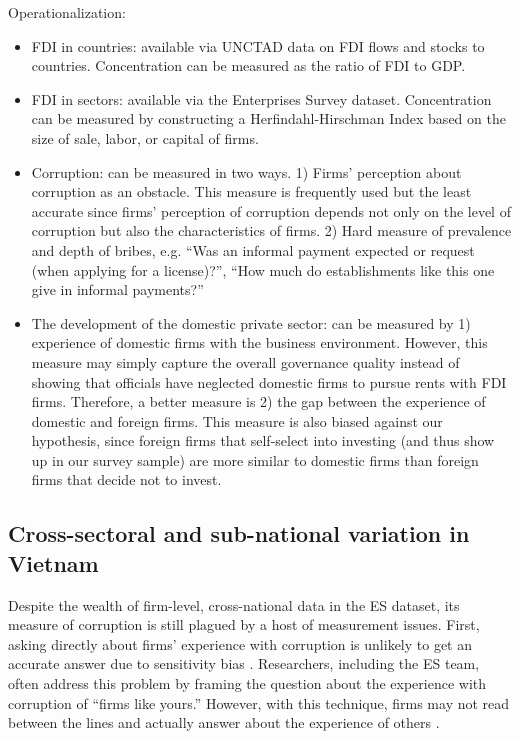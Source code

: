 \documentclass[12pt]{article}
\begin{document}
Operationalization:
\begin{itemize}
\item FDI in countries: available via UNCTAD data on FDI flows and stocks to countries. Concentration can be measured as the ratio of FDI to GDP.
\item FDI in sectors: available via the Enterprises Survey dataset. Concentration can be measured by constructing a Herfindahl-Hirschman Index based on the size of sale, labor, or capital of firms.
\item Corruption: can be measured in two ways. 1) Firms' perception about corruption as an obstacle. This measure is frequently used but the least accurate since firms' perception of corruption depends not only on the level of corruption but also the characteristics of firms. 2) Hard measure of prevalence and depth of bribes, e.g. ``Was an informal payment expected or request (when applying for a license)?'', ``How much do establishments like this one give in informal payments?''  

\item The development of the domestic private sector: can be measured by 1) experience of domestic firms with the business environment. However, this measure may simply capture the overall governance quality instead of showing that officials have neglected domestic firms to pursue rents with FDI firms. Therefore, a better measure is 2) the gap between the experience of domestic and foreign firms. This measure is also biased against our hypothesis, since foreign firms that self-select into investing (and thus show up in our survey sample) are more similar to domestic firms than foreign firms that decide not to invest.
\end{itemize}

\subsection{Cross-sectoral and sub-national variation in Vietnam}

Despite the wealth of firm-level, cross-national data in the ES dataset, its measure of corruption is still plagued by a host of measurement issues. First, asking directly about firms' experience with corruption is unlikely to get an accurate answer due to sensitivity bias \citep{Coutts2011}. Researchers, including the ES team, often address this problem by framing the question about the experience with corruption of ``firms like yours.'' However, with this technique, firms may not read between the lines and actually answer about the experience of others \citep{Ahart2004}.
\end{document}
